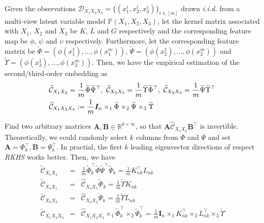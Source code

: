 \documentclass{article}
\begin{document}
Given the observations $\mathcal{D}_{X_1X_2X_3}=\{(x_1^i, x_2^i, x_3^i)\}_{i\in[m]}$ drawn \emph{i.i.d.} from a multi-view latent variable model $\mathbb{P}(X_1, X_2, X_3)$, let the kernel matrix associated with $X_1$, $X_2$ and $X_3$ be $K$, $L$ and $G$ respectively and the corresponding feature map be $\phi$, $\psi$ and $\upsilon$ respectively. Furthermore, let the corresponding feature matrix be $\widetilde \Phi=(\phi(x_1^1),\ldots,\phi(x_1^m))$, $\widetilde\Psi=(\phi(x_2^1),\ldots,\phi(x_2^m))$ and $\widetilde \Upsilon=(\phi(x_3^1),\ldots,\phi(x_3^m))$. Then, we have the empirical estimation of the second/third-order embedding as
%
\begin{align*}
&\widehat{\mathcal{C}}_{X_1 X_2} = \frac{1}{m}\widetilde \Phi \widetilde \Psi^\top,~\widehat{\mathcal{C}}_{X_3 X_1} = \frac{1}{m}\widetilde \Upsilon \widetilde \Phi^\top,~\widehat{\mathcal{C}}_{X_2 X_3} = \frac{1}{m} \widetilde \Psi \widetilde \Upsilon^\top\\
&\widehat{\mathcal{C}}_{X_1 X_2 X_3}:=
\frac{1}{m}\bm{I}_n \times_1 \widetilde \Phi \times_2 \widetilde \Psi \times_3 \widetilde \Upsilon
\end{align*}
%

Find two arbitrary matrices $\bm{A,B}\in \mathbb{R}^{k \times \infty}$, so that $\bm{A}\widehat{\mathcal{C}}_{X_1X_2}\bm{B}^\top$ is invertible. Theoretically, we could randomly select $k$ columns from $\Phi$ and $\Psi$ and set $\bm{A} = \Phi_k^\top, \bm{B} = \Psi_k^\top$. In practial, the first $k$ leading eigenvector directions of respect \emph{RKHS} works better.
%
Then, we have
%
\begin{eqnarray*}
\widetilde{\mathcal{C}}_{X_1 X_2} &=& \frac{1}{m}\widetilde \Phi_k^\top \widetilde\Phi\widetilde\Psi^\top\widetilde\Psi_k = \frac{1}{m}{K}_{nk}^\top{L}_{nk}\\
\widetilde{\mathcal{C}}_{X_3 X_1} &=& \widehat{\mathcal{C}}_{X_3X_1}\widetilde\Phi_k = \frac{1}{m}\widetilde\Upsilon{K}_{nk}\\
\widetilde{\mathcal{C}}_{X_3 X_2} &=& \widehat{\mathcal{C}}_{X_3X_2}\widetilde\Psi_k = \frac{1}{m}\widetilde\Upsilon{L}_{nk}\\
\widetilde{\mathcal{C}}_{X_1 X_2 X_3} &=&
\widehat{\mathcal{C}}_{X_1 X_2 X_3}\times_1\widetilde\Phi_k^\top
\times_2\widetilde\Psi_k^\top = \frac{1}{m} \bm{I}_n \times_1
{K}_{nk}^\top \times_2 {L}_{nk}^\top \times_3
\widetilde\Upsilon
\end{eqnarray*}
%
\end{document}
